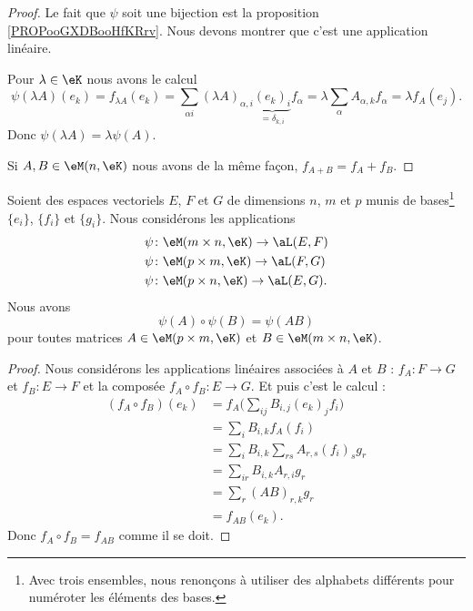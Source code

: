 \begin{proof}
	Le fait que \( \psi\) soit une bijection est la proposition \ref{PROPooGXDBooHfKRrv}. Nous devons montrer que c'est une application linéaire.

	Pour \( \lambda\in \eK\) nous avons le calcul
	\begin{equation}
		\psi(\lambda A)(e_k)=f_{\lambda A}(e_k)=\sum_{\alpha i}(\lambda A)_{\alpha, i}\underbrace{(e_k)_i}_{=\delta_{k,i}}f_{\alpha}=\lambda\sum_{\alpha}A_{\alpha, k}f_{\alpha}=\lambda f_A(e_j).
	\end{equation}
	Donc \( \psi(\lambda A)=\lambda\psi(A)\).

	Si \( A,B\in \eM(n,\eK)\) nous avons de la même façon, \( f_{A+B}=f_A+f_B\).
\end{proof}

\begin{proposition}     \label{PROPooCSJNooEqcmFm}
	Soient des espaces vectoriels \( E\), \( F\) et \( G\) de dimensions \( n\), \( m\) et \( p\) munis de bases\footnote{Avec trois ensembles, nous renonçons à utiliser des alphabets différents pour numéroter les éléments des bases.} \( \{ e_i \}\), \( \{ f_i \}\) et \( \{ g_i \}\). Nous considérons les applications
	\begin{subequations}
		\begin{align}
			\psi & \colon \eM(m\times n,\eK)\to \aL(E,F)  \\
			\psi & \colon \eM(p\times m,\eK)\to \aL(F,G)  \\
			\psi & \colon \eM(p\times n,\eK)\to \aL(E,G).
		\end{align}
	\end{subequations}
	Nous avons
	\begin{equation}
		\psi(A)\circ \psi(B)=\psi(AB)
	\end{equation}
	pour toutes matrices \( A\in \eM(p\times m,\eK)\) et \( B\in \eM(m\times n,\eK)\).
\end{proposition}

\begin{proof}
	Nous considérons les applications linéaires associées à \( A\) et \( B\) : \( f_A\colon F\to G\) et \( f_B\colon E\to F\) et la composée \( f_A\circ f_B\colon E\to G\). Et puis c'est le calcul :
	\begin{subequations}
		\begin{align}
			(f_A\circ f_B)(e_k) & =f_A\big( \sum_{ij}B_{i,j}(e_k)_j f_i \big)   \\
			                    & =\sum_i B_{i,k}f_A(f_i)                       \\
			                    & =\sum_iB_{i,k}\sum_{rs}A_{r,s}(f_i)_s g_r     \\
			                    & =\sum_{ir}B_{i,k}A_{r,i} g_r                  \\
			                    & =\sum_r(AB)_{r,k} g_r                         \\
			                    & =f_{AB}(e_k).
		\end{align}
	\end{subequations}
	Donc \( f_A\circ f_B=f_{AB}\) comme il se doit.
\end{proof}

